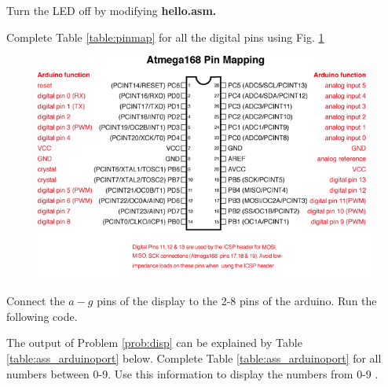 \begin{problem}
Turn the LED off by modifying \textbf{hello.asm.}
\end{problem}

%
\begin{problem}
Complete   Table \ref{table:pinmap} 
for all the digital pins using Fig. \ref{fig:Atmega168PinMap2}
\end{problem}
%

\begin{figure}[!h]
\begin{center}
\includegraphics[width=\columnwidth]{./figs/Atmega168PinMap2}
\end{center}
\caption{}
\label{fig:Atmega168PinMap2}
\end{figure}
%
\begin{problem}
\label{prob:disp}
Connect the $a-g$ pins of the display to the 2-8 pins of the arduino.  Run the following code.

\end{problem}
%
\begin{problem}
The output of Problem \ref{prob:disp} can be explained by Table \ref{table:ass_arduinoport} below. 	Complete Table \ref{table:ass_arduinoport} for all numbers between 0-9.
Use this information to display the numbers from 0-9 .

%
\end{problem}
